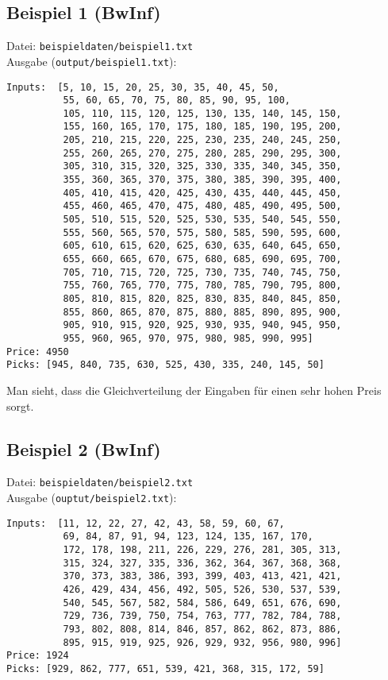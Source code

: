 \documentclass[a4paper,10pt,ngerman]{scrartcl}
\begin{document}
\subsection{Beispiel 1 (BwInf)}
Datei: \texttt{beispieldaten/beispiel1.txt}\\
Ausgabe (\texttt{output/beispiel1.txt}):
\begin{verbatim}
Inputs:  [5, 10, 15, 20, 25, 30, 35, 40, 45, 50, 
          55, 60, 65, 70, 75, 80, 85, 90, 95, 100, 
          105, 110, 115, 120, 125, 130, 135, 140, 145, 150, 
          155, 160, 165, 170, 175, 180, 185, 190, 195, 200, 
          205, 210, 215, 220, 225, 230, 235, 240, 245, 250, 
          255, 260, 265, 270, 275, 280, 285, 290, 295, 300, 
          305, 310, 315, 320, 325, 330, 335, 340, 345, 350, 
          355, 360, 365, 370, 375, 380, 385, 390, 395, 400, 
          405, 410, 415, 420, 425, 430, 435, 440, 445, 450, 
          455, 460, 465, 470, 475, 480, 485, 490, 495, 500, 
          505, 510, 515, 520, 525, 530, 535, 540, 545, 550, 
          555, 560, 565, 570, 575, 580, 585, 590, 595, 600, 
          605, 610, 615, 620, 625, 630, 635, 640, 645, 650, 
          655, 660, 665, 670, 675, 680, 685, 690, 695, 700, 
          705, 710, 715, 720, 725, 730, 735, 740, 745, 750, 
          755, 760, 765, 770, 775, 780, 785, 790, 795, 800, 
          805, 810, 815, 820, 825, 830, 835, 840, 845, 850, 
          855, 860, 865, 870, 875, 880, 885, 890, 895, 900, 
          905, 910, 915, 920, 925, 930, 935, 940, 945, 950, 
          955, 960, 965, 970, 975, 980, 985, 990, 995]
Price: 4950
Picks: [945, 840, 735, 630, 525, 430, 335, 240, 145, 50]
\end{verbatim}
Man sieht, dass die Gleichverteilung der Eingaben f\"ur einen sehr
hohen Preis sorgt.
\subsection{Beispiel 2 (BwInf)}
Datei: \texttt{beispieldaten/beispiel2.txt}\\
Ausgabe (\texttt{ouptut/beispiel2.txt}):
\begin{verbatim}
Inputs:  [11, 12, 22, 27, 42, 43, 58, 59, 60, 67, 
          69, 84, 87, 91, 94, 123, 124, 135, 167, 170, 
          172, 178, 198, 211, 226, 229, 276, 281, 305, 313, 
          315, 324, 327, 335, 336, 362, 364, 367, 368, 368,
          370, 373, 383, 386, 393, 399, 403, 413, 421, 421, 
          426, 429, 434, 456, 492, 505, 526, 530, 537, 539, 
          540, 545, 567, 582, 584, 586, 649, 651, 676, 690, 
          729, 736, 739, 750, 754, 763, 777, 782, 784, 788, 
          793, 802, 808, 814, 846, 857, 862, 862, 873, 886, 
          895, 915, 919, 925, 926, 929, 932, 956, 980, 996]
Price: 1924
Picks: [929, 862, 777, 651, 539, 421, 368, 315, 172, 59]
\end{verbatim}
\end{document}
